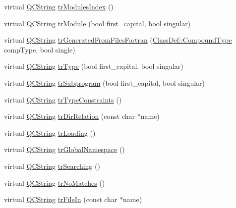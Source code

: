 \begin{DoxyCompactItemize}
\item 
virtual \mbox{\hyperlink{class_q_c_string}{Q\+C\+String}} \mbox{\hyperlink{class_translator_italian_a094d4119609a88ad6209b486aab886c4}{tr\+Modules\+Index}} ()
\item 
virtual \mbox{\hyperlink{class_q_c_string}{Q\+C\+String}} \mbox{\hyperlink{class_translator_italian_aa4abaf98353a3cd4dde1fe30e1bd3f60}{tr\+Module}} (bool first\+\_\+capital, bool singular)
\item 
virtual \mbox{\hyperlink{class_q_c_string}{Q\+C\+String}} \mbox{\hyperlink{class_translator_italian_ac0128b1da131fea6585acd3cbb7ab7ff}{tr\+Generated\+From\+Files\+Fortran}} (\mbox{\hyperlink{class_class_def_ae70cf86d35fe954a94c566fbcfc87939}{Class\+Def\+::\+Compound\+Type}} comp\+Type, bool single)
\item 
virtual \mbox{\hyperlink{class_q_c_string}{Q\+C\+String}} \mbox{\hyperlink{class_translator_italian_ab1598d928fcf4981cf664b9b13c5b1dd}{tr\+Type}} (bool first\+\_\+capital, bool singular)
\item 
virtual \mbox{\hyperlink{class_q_c_string}{Q\+C\+String}} \mbox{\hyperlink{class_translator_italian_ad964d826780fc1c39d0235a96b1a8544}{tr\+Subprogram}} (bool first\+\_\+capital, bool singular)
\item 
virtual \mbox{\hyperlink{class_q_c_string}{Q\+C\+String}} \mbox{\hyperlink{class_translator_italian_a60c14a7c39acb5257895aa373d62b357}{tr\+Type\+Constraints}} ()
\item 
virtual \mbox{\hyperlink{class_q_c_string}{Q\+C\+String}} \mbox{\hyperlink{class_translator_italian_a9a38c71fc11707e3095cf33089637526}{tr\+Dir\+Relation}} (const char $\ast$name)
\item 
virtual \mbox{\hyperlink{class_q_c_string}{Q\+C\+String}} \mbox{\hyperlink{class_translator_italian_a069fabe48f5ed739388c56794d1fcfda}{tr\+Loading}} ()
\item 
virtual \mbox{\hyperlink{class_q_c_string}{Q\+C\+String}} \mbox{\hyperlink{class_translator_italian_a71627a12293fe9dea4888f56060b9e4b}{tr\+Global\+Namespace}} ()
\item 
virtual \mbox{\hyperlink{class_q_c_string}{Q\+C\+String}} \mbox{\hyperlink{class_translator_italian_aa277a137695fe86514bea76d89476e25}{tr\+Searching}} ()
\item 
virtual \mbox{\hyperlink{class_q_c_string}{Q\+C\+String}} \mbox{\hyperlink{class_translator_italian_aeb4fccbcab8c8472bc6436141399e2c7}{tr\+No\+Matches}} ()
\item 
virtual \mbox{\hyperlink{class_q_c_string}{Q\+C\+String}} \mbox{\hyperlink{class_translator_italian_abf9ddba80a74df4604cd2e533fa4386c}{tr\+File\+In}} (const char $\ast$name)

\end{DoxyCompactItemize}

